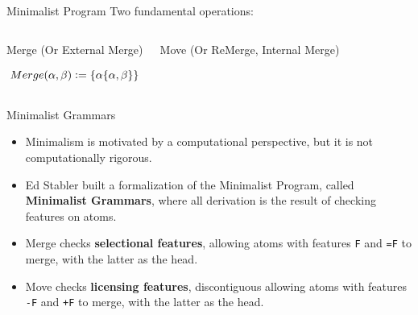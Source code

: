 \documentclass{beamer}
\newcommand{\defeq}{\vcentcolon=}
\begin{document}
\begin{frame}{Minimalist Program}
  Two fundamental operations:

  \begin{columns}
    \begin{block}{Merge}
      (Or External Merge)

      \[
        Merge( \alpha, \beta ) \defeq \{ \alpha \{ \alpha, \beta \} \}
      \]

      \begin{center}
      \end{center}
    \end{block}

    \begin{block}{Move}
      (Or ReMerge, Internal Merge)

      \begin{center}
      \end{center}
    \end{block}
  \end{columns}
\end{frame}

\begin{frame}{Minimalist Grammars}
  \begin{itemize}
  \item Minimalism is motivated by a computational perspective, but it
    is not computationally rigorous.
  \item Ed Stabler built a formalization of the Minimalist Program,
    called \textbf{Minimalist Grammars}, where all derivation is the
    result of checking features on atoms.
    \pause
  \item Merge checks \textbf{selectional features}, allowing atoms
    with features \texttt{F} and \texttt{=F} to merge, with the latter
    as the head.
  \item Move checks \textbf{licensing features}, discontiguous
    allowing atoms with features \texttt{-F} and \texttt{+F} to merge,
    with the latter as the head.
  \end{itemize}
\end{frame}
\end{document}
